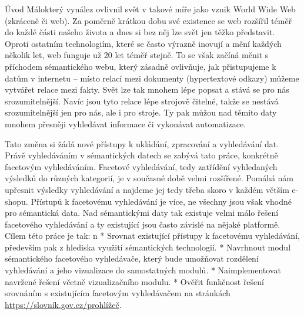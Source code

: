\chap Úvod
Málokterý vynález ovlivnil svět v takové míře jako vznik World Wide Web (zkráceně  či web). Za poměrně krátkou dobu své existence se web rozšířil téměř do každé části našeho života a dnes si bez něj 
lze svět jen těžko představit. Oproti ostatním  technologiím, které se často výrazně inovují a mění každých několik let, web funguje už 20 let téměř stejně.
To se však začíná měnit s příchodem sémantického webu, který zásadně ovlivňuje, jak přistupujeme k datům v internetu – místo relací mezi dokumenty (hypertextové odkazy) můžeme vytvářet relace mezi fakty. 
Svět lze tak mnohem lépe popsat a stává se pro nás srozumitelnější. 
Navíc jsou tyto relace lépe strojově čitelné, takže se nestává srozumitelnější jen pro nás, ale i pro stroje. 
Ty pak můžou nad těmito daty mnohem přesněji vyhledávat informace či vykonávat automatizace. 


Tato změna si žádá nové přístupy k ukládání, zpracování a vyhledávání dat. Právě vyhledáváním v sémantických datech se zabývá tato práce, konkrétně facetovým vyhledáváním. Facetové vyhledávání, tedy 
zatřídění vyhledaných výsledků do různých kategorií, je v současné době velmi rozšířené. Pomáhá nám upřesnit výsledky vyhledávání a najdeme jej tedy třeba skoro v každém větším e-shopu. Přístupů k facetovému vyhledávání je více, ne 
všechny jsou však vhodné pro sémantická data. Nad sémantickými daty tak existuje velmi málo řešení facetového vyhledávání a ty existující jsou často závislé na nějaké platformě.
Cílem této práce je tak:
\begitems \style n
* Srovnat existující přístupy k facetovému vyhledávání, především pak z hlediska využití sémantických technologií.
* Navrhnout modul sémantického facetového vyhledávače, který bude umožňovat rozdělení vyhledávání a jeho vizualizace do samostatných modulů.
* Naimplementovat navržené řešení včetně vizualizačního modulu.
* Ověřit funkčnost řešení srovnáním s existujícím facetovým vyhledávačem na stránkách \url{https://slovník.gov.cz/prohlížeč}.
\enditems
